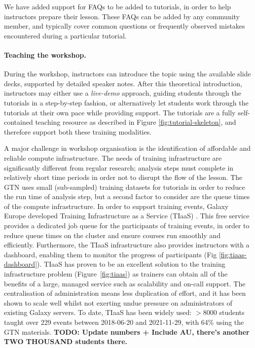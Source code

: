 \documentclass[10pt,letterpaper]{article}
\begin{document}
We have added support for FAQs to be added to tutorials, in order to help instructors prepare their lesson. These FAQs can be added by any community member, and typically cover common questions or frequently observed mistakes encountered during a particular tutorial.

\paragraph {Teaching the workshop.} During the workshop, instructors can introduce the topic using the available slide decks, supported by detailed speaker notes. After this theoretical introduction, instructors may either use a \emph{live-demo} approach, guiding students through the tutorials in a step-by-step fashion, or alternatively let students work through the tutorials at their own pace while providing support. The tutorials are a fully self-contained teaching resource as described in Figure \ref{fig:tutorial-skeleton}, and therefore support both these training modalities. 

A major challenge in workshop organisation is the identification of affordable and reliable compute infrastructure. The needs of training infrastructure are significantly different from regular research; analysis steps must complete in relatively short time periods in order not to disrupt the flow of the lesson. The GTN uses small (sub-sampled) training datasets for tutorials in order to reduce the run time of analysis step, but a second factor to consider are the queue times of the compute infrastructure. 
In order to support training events, Galaxy Europe developed Training Infrastructure as a Service (TIaaS) \cite{Rasche2020}. This free service provides a dedicated job queue for the participants of training events, in order to reduce queue times on the cluster and ensure courses run smoothly and efficiently. Furthermore, the TIaaS infrastructure also provides instructors with a dashboard, enabling them to monitor the progress of participants (Fig \ref{fig:tiaas-dashboard}). 
TIaaS has proven to be an excellent solution to the training infrastructure problem (Figure~\ref{fig:tiaas}) as trainers can obtain all of the benefits of a large, managed service such as scalability and on-call support. The centralisation of administration means less duplication of effort, and it has been shown to scale well whilst not exerting undue pressure on administrators of existing Galaxy servers. To date, TIaaS has been widely used: $>8000$ students taught over 229 events between 2018-06-20 and 2021-11-29, with 64\% using the GTN materials. \textbf{TODO: Update numbers + Include AU, there's another TWO THOUSAND students there.}
\end{document}
